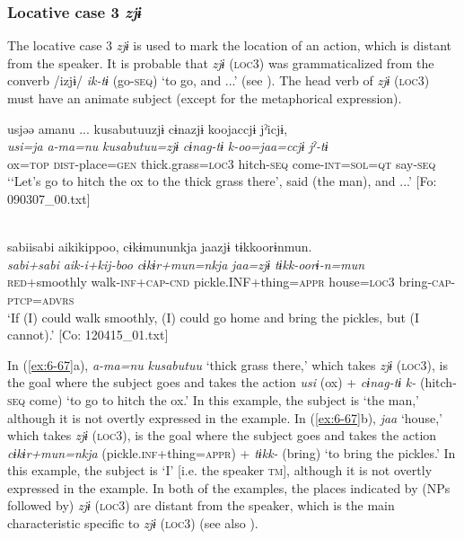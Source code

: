 \subsubsection{Locative case 3 \textit{zjɨ}}

The locative case 3 \textit{zjɨ} is used to mark the location of an action, which is distant from the speaker. It is probable that \textit{zjɨ} (\textsc{loc3}) was grammaticalized from the converb /izjɨ/ \textit{ik-tɨ} (go-\textsc{seq}) ‘to go, and ...’ (see ). The head verb of \textit{zjɨ} (\textsc{loc3}) must have an animate subject (except for the metaphorical expression).

\ea\label{ex:6-67}
\ea {\TM}  usjəə  amanu ...  kusabutuuzjɨ  cɨnazjɨ   koojaccjɨ  jˀicjɨ,\\
\glll \textit{usi=ja}  \textit{a-ma=nu}  \textit{kusabutuu=zjɨ}  \textit{cɨnag-tɨ}   \textit{k-oo=jaa=ccjɨ}  \textit{jˀ-tɨ}\\
ox=\textsc{top}  \textsc{dist}-place=\textsc{gen}  thick.grass=\textsc{loc3}  hitch-\textsc{seq}    come-\textsc{int}=\textsc{sol}=\textsc{qt}  say-\textsc{seq}\\
\glt ‘‘Let’s go to hitch the ox to the thick grass there’, said (the man), and ...’ [Fo: 090307\_00.txt]
\z

\ex\relax[= (\ref{ex:4-54}b)]\\
{\TM}
\glll  sabiisabi  aikikippoo,  cɨkɨmununkja  jaazjɨ   tɨkkoorɨnmun.\\
\textit{sabi+sabi}  \textit{aik-i+kij-boo}  \textit{cɨkɨr+mun=nkja}  \textit{jaa=zjɨ}    \textit{tɨkk-oorɨ-n=mun}\\
\textsc{red}+smoothly  walk-\textsc{inf}+\textsc{cap}-\textsc{cnd}  pickle.INF+thing=\textsc{appr}  house=\textsc{loc3} bring-\textsc{cap}-\textsc{ptcp}=\textsc{advrs}\\
\glt ‘If (I) could walk smoothly, (I) could go home and bring the pickles, but (I cannot).’ [Co: 120415\_01.txt]
\z

In (\ref{ex:6-67}a), \textit{a-ma=nu} \textit{kusabutuu} ‘thick grass there,’ which takes \textit{zjɨ} (\textsc{loc3}), is the goal where the subject goes and takes the action \textit{usi} (ox) + \textit{cɨnag-tɨ} \textit{k-} (hitch-\textsc{seq} come) ‘to go to hitch the ox.’ In this example, the subject is ‘the man,’ although it is not overtly expressed in the example. In (\ref{ex:6-67}b), \textit{jaa} ‘house,’ which takes \textit{zjɨ} (\textsc{loc3}), is the goal where the subject goes and takes the action \textit{cɨkɨr+mun=nkja} (pickle.\textsc{inf}+thing=\textsc{appr}) + \textit{tɨkk-} (bring) ‘to bring the pickles.’ In this example, the subject is ‘I’ [i.e. the speaker \textsc{tm}], although it is not overtly expressed in the example. In both of the examples, the places indicated by (NPs followed by) \textit{zjɨ} (\textsc{loc3}) are distant from the speaker, which is the main characteristic specific to \textit{zjɨ} (\textsc{loc3}) (see also ).

